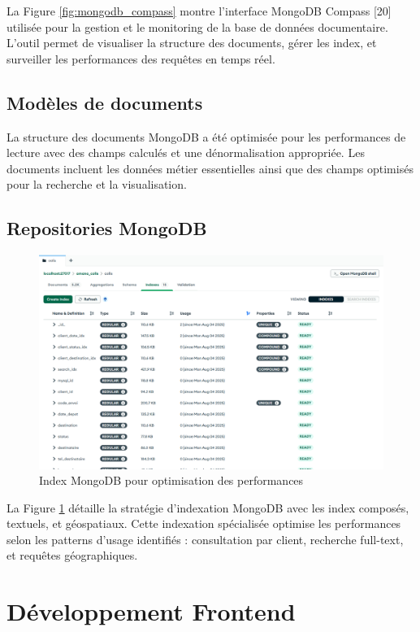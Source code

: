 La Figure \ref{fig:mongodb_compass} montre l'interface MongoDB Compass [20] utilisée pour la gestion et le monitoring de la base de données documentaire. L'outil permet de visualiser la structure des documents, gérer les index, et surveiller les performances des requêtes en temps réel.

\subsection{Modèles de documents}

La structure des documents MongoDB a été optimisée pour les performances de lecture avec des champs calculés et une dénormalisation appropriée. Les documents incluent les données métier essentielles ainsi que des champs optimisés pour la recherche et la visualisation.

\subsection{Repositories MongoDB}

\begin{figure}[H]
\centering
\includegraphics[width=1.0\textwidth]{images/mongodb_indexes.png}
\caption{Index MongoDB pour optimisation des performances}
\label{fig:mongodb_indexes}
\end{figure}

La Figure \ref{fig:mongodb_indexes} détaille la stratégie d'indexation MongoDB avec les index composés, textuels, et géospatiaux. Cette indexation spécialisée optimise les performances selon les patterns d'usage identifiés : consultation par client, recherche full-text, et requêtes géographiques.
\section{Développement Frontend}

